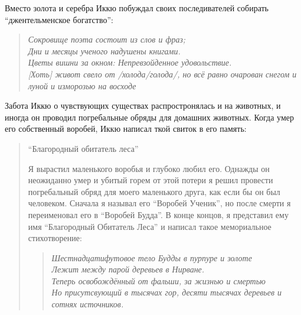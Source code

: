 \begin{ver}
Вместо золота и серебра Иккю побуждал своих последивателей собирать
``джентельменское богатство'':
\end{ver}

\begin{ver}
  \begin{verse}\it
  Сокровище поэта состоит из слов и фраз;\\
  Дни и месяцы ученого надушены книгами.\\
  Цветы вишни за окном:
  Непревзойденное удовольствие.\\
  {}[Хоть] живот свело от /холода/голода/, но всё равно очарован снегом
  и луной и изморозью на восходе 
  \end{verse}
\end{ver}

\begin{ver}
  Забота Иккю о чувствующих существах распростронялась и на животных,
  и иногда он проводил погребальные обряды для домашних
  животных. Когда умер его собственный воробей, Иккю написал ткой
  свиток в его память:
\end{ver}

\begin{ver}
  \begin{quote}
    \centerline{``Благородный обитатель леса''}
    Я вырастил маленького воробья и глубоко любил его. Однажды он
    неожиданно умер и убитый горем от этой потери я решил провести
    погребальный обряд для моего маленького друга, как если бы он был
    человеком. Сначала я называл его ``Воробей Ученик'', но после
    смерти я переименовал его в ``Воробей Будда''. В конце концов, я
    представил ему имя ``Благородный Обитатель Леса'' и написал такое
    мемориальное стихотворение:
    \begin{verse}\it
      Шестнадцатифутовое тело Будды в пурпуре и золоте\\
      Лежит между парой деревьев в Нирване.\\
      Теперь освобождённый от фальши, за жизнью и смертью\\
      Но присутсвующий в тысячах гор, десяти тысячах деревьев и сотнях источников.
    \end{verse}
  \end{quote}
\end{ver}
